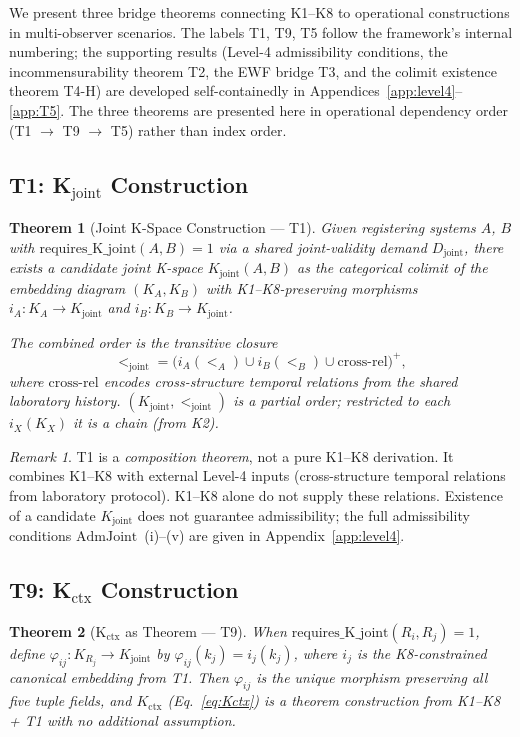 \documentclass[12pt,a4paper]{article}
\theoremstyle{plain}
\newtheorem{theorem}{Theorem}[section]
\theoremstyle{definition}
\theoremstyle{remark}
\newtheorem{remark}{Remark}[section]
\newcommand{\Kjoint}{K_{\mathrm{joint}}}
\newcommand{\Kctx}{K_{\mathrm{ctx}}}
\newcommand{\phiij}{\varphi_{ij}}
\begin{document}
We present three bridge theorems connecting K1--K8 to operational
constructions in multi-observer scenarios.
The labels T1, T9, T5 follow the framework's internal numbering; the
supporting results (Level-4 admissibility conditions, the incommensurability
theorem T2, the EWF bridge T3, and the colimit existence theorem T4-H) are
developed self-containedly in
Appendices~\ref{app:level4}--\ref{app:T5}. The three theorems are presented
here in operational dependency order (T1 $\to$ T9 $\to$ T5) rather than index
order.

\subsection{T1: K$_{\mathrm{joint}}$ Construction}

\begin{theorem}[Joint K-Space Construction --- T1]\label{thm:T1}
Given registering systems $A$, $B$ with
$\mathrm{requires\_K\_joint}(A,B) = 1$ via a shared joint-validity demand
$D_{\mathrm{joint}}$, there exists a candidate joint K-space
$\Kjoint(A,B)$ as the categorical colimit of the embedding diagram
$(K_A, K_B)$ with K1--K8-preserving morphisms $i_A\colon K_A \to \Kjoint$
and $i_B\colon K_B \to \Kjoint$.

The combined order is the transitive closure
\[
  {<}_{\mathrm{joint}}
  = \bigl(i_A({<_A}) \cup i_B({<_B}) \cup \mathrm{cross\text{-}rel}\bigr)^+,
\]
where $\mathrm{cross\text{-}rel}$ encodes cross-structure temporal relations
from the shared laboratory history. $(\Kjoint, {<}_{\mathrm{joint}})$ is a
partial order; restricted to each $i_X(K_X)$ it is a chain (from K2).
\end{theorem}

\begin{remark}
T1 is a \emph{composition theorem}, not a pure K1--K8 derivation. It combines
K1--K8 with external Level-4 inputs (cross-structure temporal relations from
laboratory protocol). K1--K8 alone do not supply these relations. Existence
of a candidate $\Kjoint$ does not guarantee admissibility; the full
admissibility conditions $\mathrm{AdmJoint}$~(i)--(v) are given in
Appendix~\ref{app:level4}.
\end{remark}

\subsection{T9: K$_{\mathrm{ctx}}$ Construction}

\begin{theorem}[K$_{\mathrm{ctx}}$ as Theorem --- T9]\label{thm:T9}
When $\mathrm{requires\_K\_joint}(R_i,R_j) = 1$, define
$\phiij\colon K_{R_j} \to \Kjoint$ by $\phiij(k_j) = i_j(k_j)$,
where $i_j$ is the K8-constrained canonical embedding from T1.
Then $\phiij$ is the unique morphism preserving all five tuple fields, and
$\Kctx$ (Eq.~\eqref{eq:Kctx}) is a theorem construction from K1--K8 + T1
with no additional assumption.
\end{theorem}
\end{document}
